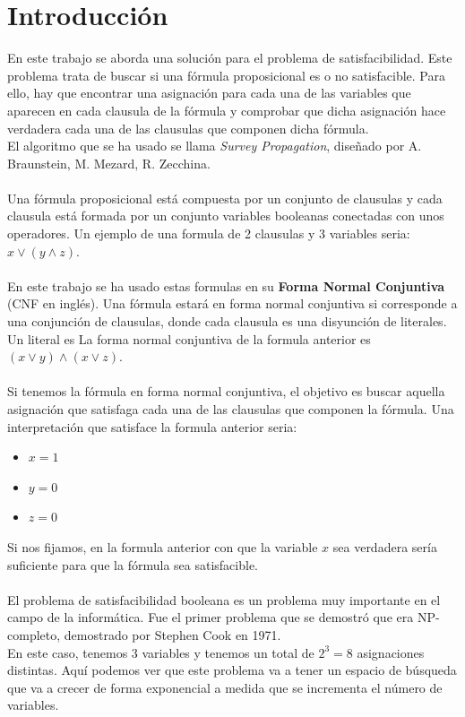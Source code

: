 \section{Introducción}
En este trabajo se aborda una solución para el problema de satisfacibilidad. Este problema trata de buscar si una fórmula proposicional es o no satisfacible. Para ello, hay que encontrar una asignación para cada una de las variables que aparecen en cada clausula de la fórmula y comprobar que dicha asignación hace verdadera cada una de las clausulas que componen dicha fórmula.\\
El algoritmo que se ha usado se llama \textit{Survey Propagation}, diseñado por A. Braunstein, M. Mezard, R. Zecchina. \\\\
Una fórmula proposicional está compuesta por un conjunto de clausulas y cada clausula está formada por un conjunto variables booleanas conectadas con unos operadores. Un ejemplo de una formula de 2 clausulas y 3 variables seria: $x \lor (y \land z)$.\\\\
En este trabajo se ha usado estas formulas en su \textbf{Forma Normal Conjuntiva} (CNF en inglés).
Una fórmula estará en forma normal conjuntiva si corresponde a una conjunción de clausulas, donde cada clausula es una disyunción de literales. Un literal es La forma normal conjuntiva de la formula anterior es $(x \lor y)\land (x \lor z)$.\\\\
Si tenemos la fórmula en forma normal conjuntiva, el objetivo es buscar aquella asignación que satisfaga cada una de las clausulas que componen la fórmula. Una interpretación que satisface la formula anterior seria:
\begin{itemize}
	\item $x=1$
	\item $y=0$
	\item $z=0$
\end{itemize}
Si nos fijamos, en la formula anterior con que la variable $x$ sea verdadera sería suficiente para que la fórmula sea satisfacible.\\\\
El problema de satisfacibilidad booleana es un problema muy importante en el campo de la informática. Fue el primer problema que se demostró que era NP-completo, demostrado por Stephen Cook en 1971.\\
En este caso, tenemos 3 variables y tenemos un total de $2^3 = 8$ asignaciones distintas. Aquí podemos ver que este problema va a tener un espacio de búsqueda que va a crecer de forma exponencial a medida que se incrementa el número de variables. 
